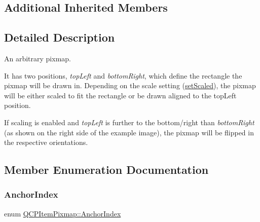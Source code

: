 \subsection*{Additional Inherited Members}


\subsection{Detailed Description}
An arbitrary pixmap. 

 It has two positions, {\itshape top\+Left} and {\itshape bottom\+Right}, which define the rectangle the pixmap will be drawn in. Depending on the scale setting (\mbox{\hyperlink{class_q_c_p_item_pixmap_ab4d44529a1c6c8d37d0ea7560e042777}{set\+Scaled}}), the pixmap will be either scaled to fit the rectangle or be drawn aligned to the top\+Left position.

If scaling is enabled and {\itshape top\+Left} is further to the bottom/right than {\itshape bottom\+Right} (as shown on the right side of the example image), the pixmap will be flipped in the respective orientations. 

\subsection{Member Enumeration Documentation}
\mbox{\label{class_q_c_p_item_pixmap_a0ea7f65edb7395e02de521915f221174}} 
\subsubsection{\texorpdfstring{AnchorIndex}{AnchorIndex}}
{\footnotesize\ttfamily enum \mbox{\hyperlink{class_q_c_p_item_pixmap_a0ea7f65edb7395e02de521915f221174}{Q\+C\+P\+Item\+Pixmap\+::\+Anchor\+Index}}\hspace{0.3cm}{\ttfamily [protected]}}


